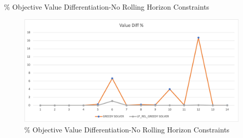 \documentclass[11pt]{article}
\begin{document}
{\begin{landscape}
        \begin{table}[htb]
                \centering
                \caption[Short Caption for LoT]{\% Objective Value Differentiation-No Rolling Horizon Constraints}\label{table:tbl_test_obj_diff_no_rh}
        \end{table}
        \begin{figure}[htp]
            \centering
            \includegraphics[width=12cm]{value_diff_no_rh}
            \caption{\% Objective Value Differentiation-No Rolling Horizon Constraints}
            \label{fig:fig_value_diff_no_rh}
        \end{figure}


\end{landscape}}
\end{document}
